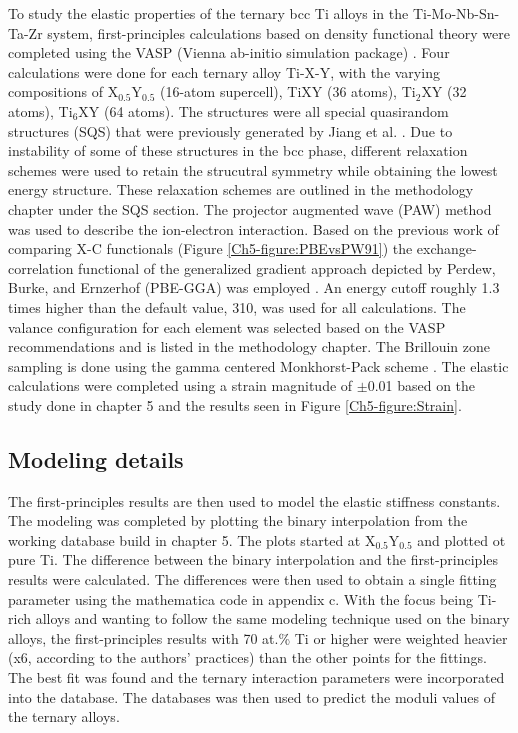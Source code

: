 To study the elastic properties of the ternary bcc Ti alloys in the Ti-Mo-Nb-Sn-Ta-Zr system, first-principles calculations based on density functional theory were completed using the VASP (Vienna ab-initio simulation package) \cite{Kresse1996,Kresse1999}. Four calculations were done for each ternary alloy Ti-X-Y, with the varying compositions of X$_{0.5}$Y$_{0.5}$ (16-atom supercell), TiXY (36 atoms), Ti$_2$XY (32 atoms), Ti$_6$XY (64 atoms). The structures were all special quasirandom structures (SQS) that were previously generated by Jiang et al. \cite{Jiang2004,Jiang2009}. Due to instability of some of these structures in the bcc phase, different relaxation schemes were used to retain the strucutral symmetry while obtaining the lowest energy structure. These relaxation schemes are outlined in the methodology chapter under the SQS section. The projector augmented wave (PAW) method was used to describe the ion-electron interaction. Based on the previous work of comparing X-C functionals (Figure \ref{Ch5-figure:PBEvsPW91}) the exchange-correlation functional of the generalized gradient approach depicted by Perdew, Burke, and Ernzerhof (PBE-GGA) was employed \cite{Perdew1996a}. An energy cutoff roughly 1.3 times higher than the default value, 310, was used for all calculations. The valance configuration for each element was selected based on the VASP recommendations and is listed in the methodology chapter. The Brillouin zone sampling is done using the gamma centered Monkhorst-Pack scheme \cite{Monkhorst1976a}. The elastic calculations were completed using a strain magnitude of $\pm$0.01 based on the study done in chapter 5 and the results seen in Figure \ref{Ch5-figure:Strain}.

\subsection{Modeling details}

The first-principles results are then used to model the elastic stiffness constants. The modeling was completed by plotting the binary interpolation from the working database build in chapter 5. The plots started at X$_{0.5}$Y$_{0.5}$ and plotted ot pure Ti. The difference between the binary interpolation and the first-principles results were calculated. The differences were then used to obtain a single fitting parameter using the mathematica code in appendix c. With the focus being Ti-rich alloys and wanting to follow the same modeling technique used on the binary alloys, the first-principles results with 70 at.\% Ti or higher were weighted heavier (x6, according to the authors' practices) than the other points for the fittings. The best fit was found and the ternary interaction parameters were incorporated into the database. The databases was then used to predict the moduli values of the ternary alloys. 

